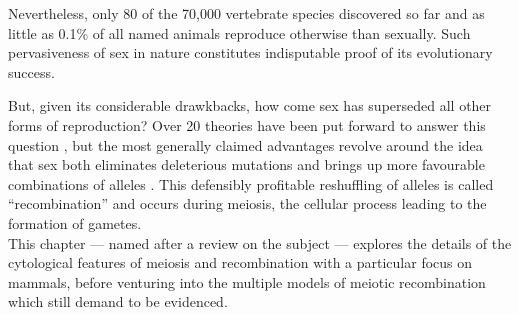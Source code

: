 Nevertheless, only 80 \citep{vrijenhoek1989list,neaves2011unisexual} of the 70,000 vertebrate species discovered so far \citep{iucn2019} and as little as 0.1\% of all named animals \citep{vrijenhoek1998animal} reproduce otherwise than sexually. %
Such pervasiveness of sex in nature constitutes indisputable proof of its evolutionary success. 

But, given its considerable drawkbacks, how come sex has superseded all other forms of reproduction?
Over 20 theories have been put forward to answer this question \citep{kondrashov1993classification}, but the most generally claimed advantages revolve around the idea that sex both eliminates deleterious mutations and brings up more favourable combinations of alleles \citep{normarck2003genomic, speijer2016can}.
This defensibly profitable reshuffling of alleles is called “recombination” and occurs during meiosis, the cellular process leading to the formation of gametes.\\

This chapter — named after a review on the subject \citep{hunter2015meiotic} — explores the details of the cytological features of meiosis and recombination with a particular focus on mammals, before venturing into the multiple models of meiotic recombination which still demand to be evidenced.





